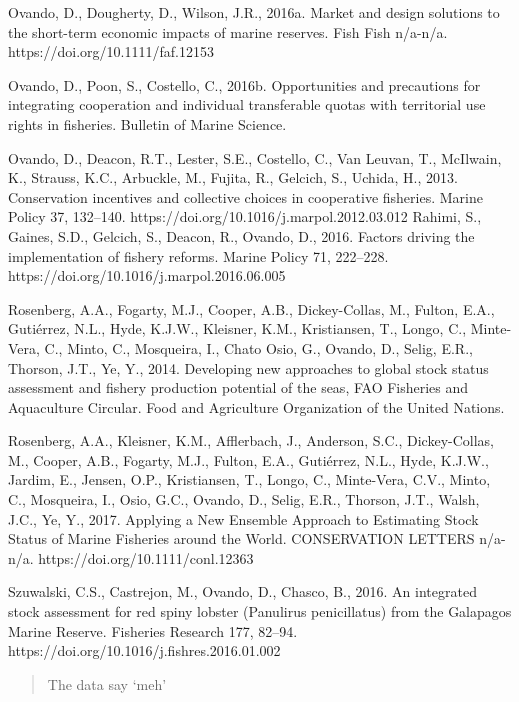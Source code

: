 \documentclass[twoside,12pt,final]{ucthesis-CA2012}
\begin{document}
\begin{ucfrontmatter}
\begin{vitae}
Ovando, D., Dougherty, D., Wilson, J.R., 2016a. Market and design solutions to the short-term economic impacts of marine reserves. Fish Fish n/a-n/a. https://doi.org/10.1111/faf.12153

Ovando, D., Poon, S., Costello, C., 2016b. Opportunities and precautions for integrating cooperation and individual transferable quotas with territorial use rights in fisheries. Bulletin of Marine Science.

Ovando, D., Deacon, R.T., Lester, S.E., Costello, C., Van Leuvan, T., McIlwain, K., Strauss, K.C., Arbuckle, M., Fujita, R., Gelcich, S., Uchida, H., 2013. Conservation incentives and collective choices in cooperative fisheries. Marine Policy 37, 132–140. https://doi.org/10.1016/j.marpol.2012.03.012
Rahimi, S., Gaines, S.D., Gelcich, S., Deacon, R., Ovando, D., 2016. Factors driving the implementation of fishery reforms. Marine Policy 71, 222–228. https://doi.org/10.1016/j.marpol.2016.06.005

Rosenberg, A.A., Fogarty, M.J., Cooper, A.B., Dickey-Collas, M., Fulton, E.A., Gutiérrez, N.L., Hyde, K.J.W., Kleisner, K.M., Kristiansen, T., Longo, C., Minte-Vera, C., Minto, C., Mosqueira, I., Chato Osio, G., Ovando, D., Selig, E.R., Thorson, J.T., Ye, Y., 2014. Developing new approaches to global stock status assessment and fishery production potential of the seas, FAO Fisheries and Aquaculture Circular. Food and Agriculture Organization of the United Nations.

Rosenberg, A.A., Kleisner, K.M., Afflerbach, J., Anderson, S.C., Dickey-Collas, M., Cooper, A.B., Fogarty, M.J., Fulton, E.A., Gutiérrez, N.L., Hyde, K.J.W., Jardim, E., Jensen, O.P., Kristiansen, T., Longo, C., Minte-Vera, C.V., Minto, C., Mosqueira, I., Osio, G.C., Ovando, D., Selig, E.R., Thorson, J.T., Walsh, J.C., Ye, Y., 2017. Applying a New Ensemble Approach to Estimating Stock Status of Marine Fisheries around the World. CONSERVATION LETTERS n/a-n/a. https://doi.org/10.1111/conl.12363

Szuwalski, C.S., Castrejon, M., Ovando, D., Chasco, B., 2016. An integrated stock assessment for red spiny lobster (Panulirus penicillatus) from the Galapagos Marine Reserve. Fisheries Research 177, 82–94. https://doi.org/10.1016/j.fishres.2016.01.002


  \end{vitae}
  \begin{abstract}

    The data say `meh'

  \end{abstract}
	\tableofcontents

	  \listoftables
  
    \listoffigures
  
\end{ucfrontmatter}
\end{document}
